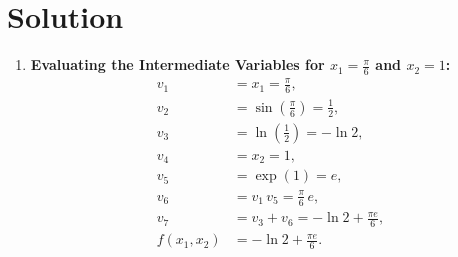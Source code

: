 \documentclass[submit]{../harvardml}
\newenvironment{answer}
  {\section*{Solution}}
{}
\begin{document}
\begin{answer}
\begin{enumerate}
          \begin{enumerate}
            \item \textbf{Evaluating the Intermediate Variables for $x_1=\frac{\pi}{6}$ and $x_2=1$:}
                  \begin{align*}
                    v_1        & = x_1 = \frac{\pi}{6},\\[1mm]
                    v_2        & = \sin\left(\frac{\pi}{6}\right) = \frac{1}{2},\\[1mm]
                    v_3        & = \ln\left(\frac{1}{2}\right) = -\ln 2,\\[1mm]
                    v_4        & = x_2 = 1,\\[1mm]
                    v_5        & = \exp(1) = e,\\[1mm]
                    v_6        & = v_1\,v_5 = \frac{\pi}{6}\,e,\\[1mm]
                    v_7        & = v_3 + v_6 = -\ln 2 + \frac{\pi e}{6},\\[1mm]
                    f(x_1,x_2) & = -\ln 2 + \frac{\pi e}{6}.
                  \end{align*}


\end{enumerate}
\end{enumerate}
\end{answer}
\end{document}
